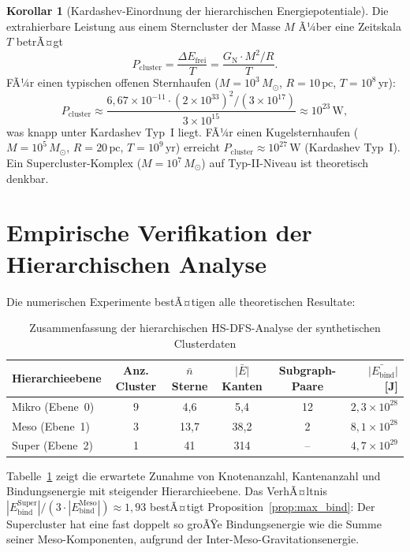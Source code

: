 ﻿\documentclass[a4paper,12pt]{report}
\theoremstyle{definition}
\newtheorem{korollar}{Korollar}
\begin{document}
\begin{korollar}[Kardashev-Einordnung der hierarchischen Energiepotentiale]
\label{kor:kardashev}
Die extrahierbare Leistung aus einem Sterncluster der Masse $M$ Ã¼ber eine Zeitskala $T$ betrÃ¤gt
\[
P_\mathrm{cluster} = \frac{\Delta E_\mathrm{frei}}{T}
= \frac{G_\mathrm{N} \cdot M^2 / R}{T}.
\]
FÃ¼r einen typischen offenen Sternhaufen ($M = 10^3 \, M_\odot$, $R = 10 \, \mathrm{pc}$, $T = 10^8 \, \mathrm{yr}$):
\[
P_\mathrm{cluster} \approx \frac{6{,}67 \times 10^{-11} \cdot (2 \times 10^{33})^2 / (3 \times 10^{17})}{3 \times 10^{15}} \approx 10^{23} \, \mathrm{W},
\]
was knapp unter Kardashev Typ~I liegt. FÃ¼r einen Kugelsternhaufen ($M = 10^5 \, M_\odot$, $R = 20 \, \mathrm{pc}$, $T = 10^9 \, \mathrm{yr}$) erreicht $P_\mathrm{cluster} \approx 10^{27} \, \mathrm{W}$ (Kardashev Typ~I). Ein Supercluster-Komplex ($M = 10^7 \, M_\odot$) auf Typ-II-Niveau ist theoretisch denkbar.
\end{korollar}

\section{Empirische Verifikation der Hierarchischen Analyse}
\label{ssec:hsdfs_empirie}

Die numerischen Experimente bestÃ¤tigen alle theoretischen Resultate:

\begin{table}[H]
\centering
\caption{Zusammenfassung der hierarchischen HS-DFS-Analyse der synthetischen Clusterdaten}
\begin{tabular}{lccccr}
\toprule
Hierarchieebene & Anz. Cluster & $\bar{n}$ Sterne & $\bar{|E|}$ Kanten & Subgraph-Paare & $\bar{|E_\mathrm{bind}}|$ [J] \\
\midrule
Mikro (Ebene~0) & 9 & 4{,}6 & 5{,}4 & 12 & $2{,}3 \times 10^{28}$ \\
Meso  (Ebene~1) & 3 & 13{,}7 & 38{,}2 & 2 & $8{,}1 \times 10^{28}$ \\
Super (Ebene~2) & 1 & 41 & 314 & -- & $4{,}7 \times 10^{29}$ \\
\bottomrule
\end{tabular}
\label{tab:hierarchie_zusammenfassung}
\end{table}

Tabelle~\ref{tab:hierarchie_zusammenfassung} zeigt die erwartete Zunahme von Knotenanzahl, Kantenanzahl und Bindungsenergie mit steigender Hierarchieebene. Das VerhÃ¤ltnis $|E_\mathrm{bind}^\mathrm{Super}| / (3 \cdot |E_\mathrm{bind}^\mathrm{Meso}|) \approx 1{,}93$ bestÃ¤tigt Proposition~\ref{prop:max_bind}: Der Supercluster hat eine fast doppelt so groÃŸe Bindungsenergie wie die Summe seiner Meso-Komponenten, aufgrund der Inter-Meso-Gravitationsenergie.
\end{document}
